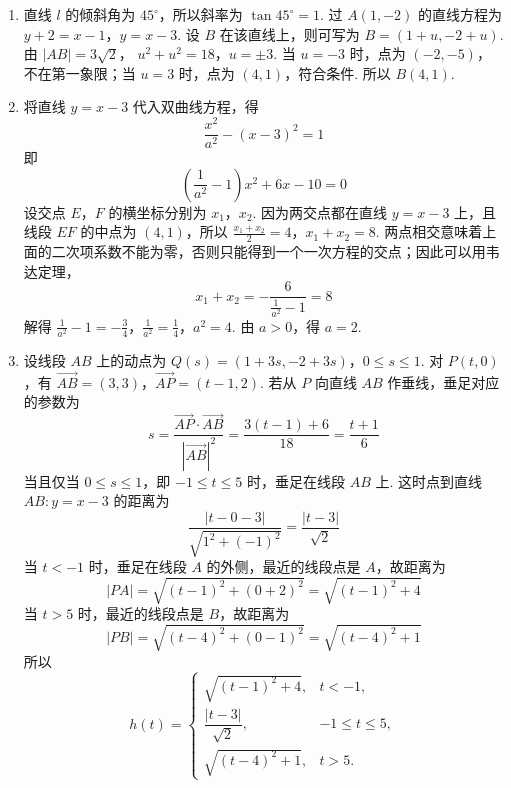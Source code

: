 \begin{solution}
\begin{enumerate}
\item 直线 \(l\) 的倾斜角为 \(45^{\circ}\)，所以斜率为 \(\tan45^{\circ}=1\). 过 \(A(1,-2)\) 的直线方程为
\(y+2=x-1\)，\(y=x-3\).
设 \(B\) 在该直线上，则可写为 \(B=(1+u,-2+u)\). 由 \(|AB|=3\sqrt{2}\)，
\(u^2+u^2=18\)，\(u=\pm3\).
当 \(u=-3\) 时，点为 \((-2,-5)\)，不在第一象限；当 \(u=3\) 时，点为 \((4,1)\)，符合条件. 所以 \(B(4,1)\).

\item 将直线 \(y=x-3\) 代入双曲线方程，得
\[
\frac{x^2}{a^2}-(x-3)^2=1
\]
即
\[
\left(\frac{1}{a^2}-1\right)x^2+6x-10=0
\]
设交点 \(E\)，\(F\) 的横坐标分别为 \(x_1\)，\(x_2\). 因为两交点都在直线 \(y=x-3\) 上，且线段 \(EF\) 的中点为 \((4,1)\)，所以
\(\frac{x_1+x_2}{2}=4\)，\(x_1+x_2=8\).
两点相交意味着上面的二次项系数不能为零，否则只能得到一个一次方程的交点；因此可以用韦达定理，
\[
x_1+x_2=-\frac{6}{\frac{1}{a^2}-1}=8
\]
解得
\(\frac{1}{a^2}-1=-\frac{3}{4}\)，\(\frac{1}{a^2}=\frac{1}{4}\)，\(a^2=4\).
由 \(a>0\)，得 \(a=2\).

\item 设线段 \(AB\) 上的动点为
\(Q(s)=(1+3s,-2+3s)\)，\(0\leqslant s\leqslant1\).
对 \(P(t,0)\)，有
\(\overrightarrow{AB}=(3,3)\)，\(\overrightarrow{AP}=(t-1,2)\).
若从 \(P\) 向直线 \(AB\) 作垂线，垂足对应的参数为
\[
s=\frac{\overrightarrow{AP}\cdot\overrightarrow{AB}}{|\overrightarrow{AB}|^2}
=\frac{3(t-1)+6}{18}=\frac{t+1}{6}
\]
当且仅当 \(0\leqslant s\leqslant1\)，即 \(-1\leqslant t\leqslant5\) 时，垂足在线段 \(AB\) 上. 这时点到直线 \(AB:y=x-3\) 的距离为
\[
\frac{|t-0-3|}{\sqrt{1^2+(-1)^2}}=\frac{|t-3|}{\sqrt{2}}
\]
当 \(t<-1\) 时，垂足在线段 \(A\) 的外侧，最近的线段点是 \(A\)，故距离为
\[
|PA|=\sqrt{(t-1)^2+(0+2)^2}=\sqrt{(t-1)^2+4}
\]
当 \(t>5\) 时，最近的线段点是 \(B\)，故距离为
\[
|PB|=\sqrt{(t-4)^2+(0-1)^2}=\sqrt{(t-4)^2+1}
\]
所以
\[
h(t)=
\begin{cases}
\sqrt{(t-1)^2+4}, & t<-1,\\
\dfrac{|t-3|}{\sqrt{2}}, & -1\leqslant t\leqslant5,\\
\sqrt{(t-4)^2+1}, & t>5.
\end{cases}
\]
\end{enumerate}
\end{solution}
